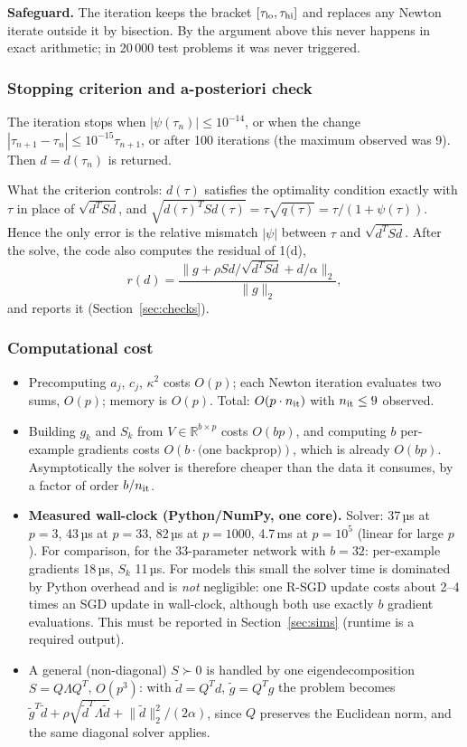 \documentclass[11pt,a4paper]{article}
\newcommand{\norm}[1]{\lVert #1\rVert_2}
\begin{document}
\textbf{Safeguard.} The iteration keeps the bracket $[\tau_{\rm lo},\tau_{\rm hi}]$
and replaces any Newton iterate outside it by bisection. By the argument above this
never happens in exact arithmetic; in 20\,000 test problems it was never triggered.

\subsubsection*{Stopping criterion and a-posteriori check}

The iteration stops when $|\psi(\tau_n)|\le10^{-14}$, or when the change
$|\tau_{n+1}-\tau_n|\le10^{-15}\tau_{n+1}$, or after 100 iterations (the maximum
observed was 9). Then $d=d(\tau_n)$ is returned.

What the criterion controls: $d(\tau)$ satisfies the optimality condition exactly
with $\tau$ in place of $\sqrt{d^TSd}$, and
$\sqrt{d(\tau)^TSd(\tau)}=\tau\sqrt{q(\tau)}=\tau/(1+\psi(\tau))$. Hence the only
error is the relative mismatch $|\psi|$ between $\tau$ and $\sqrt{d^TSd}$. After the
solve, the code also computes the residual of 1(d),
\begin{equation*}
r(d)=\frac{\norm{g+\rho Sd/\sqrt{d^TSd}+d/\alpha}}{\norm g},
\end{equation*}
and reports it (Section~\ref{sec:checks}).

\subsubsection*{Computational cost}

\begin{itemize}
\item Precomputing $a_j$, $c_j$, $\kappa^2$ costs $O(p)$; each Newton iteration
evaluates two sums, $O(p)$; memory is $O(p)$. Total: $O(p\cdot n_{\rm it})$ with
$n_{\rm it}\le9$ observed.
\item Building $g_k$ and $S_k$ from $V\in\mathbb R^{b\times p}$ costs $O(bp)$, and
computing $b$ per-example gradients costs $O(b\cdot\text{(one backprop)})$, which is
already $O(bp)$. Asymptotically the solver is therefore cheaper than the data it
consumes, by a factor of order $b/n_{\rm it}$.
\item \textbf{Measured wall-clock (Python/NumPy, one core).} Solver: 37\,µs at
$p=3$, 43\,µs at $p=33$, 82\,µs at $p=1000$, 4.7\,ms at $p=10^5$ (linear for large
$p$). For comparison, for the 33-parameter network with $b=32$: per-example gradients
18\,µs, $S_k$ 11\,µs. For models this small the solver time is dominated by Python
overhead and is \emph{not} negligible: one R-SGD update costs about 2--4 times an SGD
update in wall-clock, although both use exactly $b$ gradient evaluations. This must be
reported in Section~\ref{sec:sims} (runtime is a required output).
\item A general (non-diagonal) $S\succ0$ is handled by one eigendecomposition
$S=Q\Lambda Q^T$, $O(p^3)$: with $\tilde d=Q^Td$, $\tilde g=Q^Tg$ the problem becomes
$\tilde g^T\tilde d+\rho\sqrt{\tilde d^T\Lambda\tilde d}+\norm{\tilde d}^2/(2\alpha)$,
since $Q$ preserves the Euclidean norm, and the same diagonal solver applies.
\end{itemize}
\end{document}
